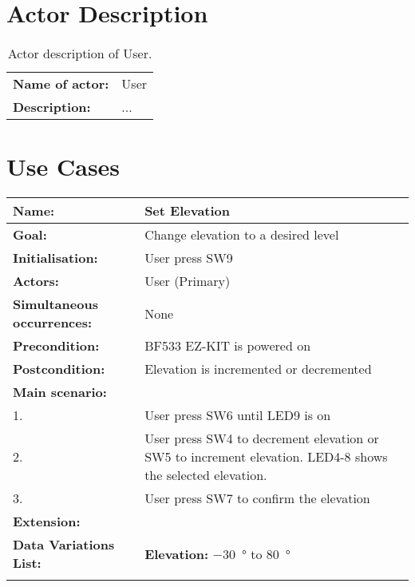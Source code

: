 \section{Actor Description}

\begin{table}[H] 
	\begin{threeparttable}
		\begin{tabularx}{\linewidth}{ l X }
			\toprule
			\bfseries{Name of actor:}	& User \\ 
			\bfseries{Description:} 	& ...   \\     
			\bottomrule
		\end{tabularx}
	\end{threeparttable}
	\caption{Actor description of User.}
	\label{tab:actordescription}
\end{table}

\section{Use Cases}

\begin{longtabu}{X[0.45l] X[0.75l]}
	\textbf{Name:} &  Set Elevation\\ %
	\midrule
	\textbf{Goal:} &  Change elevation to a desired level\\ %
	\midrule
	\textbf{Initialisation:} &  User press SW9\\ %
	\midrule
	\textbf{Actors:} &  User (Primary)\\ %
	\midrule
	\textbf{Simultaneous occurrences:} & None \\ %
	\midrule
	\textbf{Precondition:} &  BF533 EZ-KIT is powered on\\ %
	\midrule
	\textbf{Postcondition:} &  Elevation is incremented or decremented\\ %
	\midrule
	\bfseries{Main scenario:} & \\
	1. & User press SW6 until LED9 is on\\
	2. & User press SW4 to decrement elevation or SW5 to increment elevation. LED4-8 shows the selected elevation.\\
	3. & User press SW7 to confirm the elevation\\
	\midrule
	\bfseries{Extension:} & \\
	\midrule
	\bfseries{Data Variations List:} & \textbf{Elevation:} \SI{-30}{\degree} to \SI{80}{\degree} \\
	\midrule\\
\end{longtabu}


